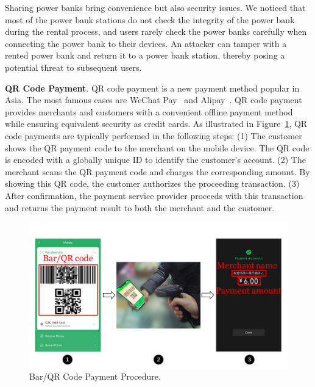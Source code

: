 
Sharing power banks bring convenience but also security issues.
We noticed that most of the power bank stations do not check the integrity of the power bank during the rental process, and users rarely check the power banks carefully when connecting the power bank to their devices.
An attacker can tamper with a rented power bank and return it to a power bank station, thereby posing a potential threat to subsequent users.


\textbf{QR Code Payment}.
QR code payment is a new payment method popular in Asia.
The most famous cases are WeChat Pay~\cite{Wechat-pay} and Alipay~\cite{AliPay}.
QR code payment provides merchants and customers with a convenient offline payment method while ensuring equivalent security as credit cards.
As illustrated in Figure~\ref{fig:qr_payment_procedure}, QR code payments are typically performed in the following steps:
(1) The customer shows the QR payment code to the merchant on the mobile device.
The QR code is encoded with a globally unique ID to identify the customer's account.
(2) The merchant scans the QR payment code and charges the corresponding amount.
By showing this QR code, the customer authorizes the proceeding transaction.
(3) After confirmation, the payment service provider proceeds with this transaction and returns the payment result to both the merchant and the customer.

\begin{figure}[t]
	\centering
	\includegraphics[width=\linewidth]{./Figs/qr_code_payment.png}
	\caption{Bar/QR Code Payment Procedure.}
	\label{fig:qr_payment_procedure}
\end{figure}


